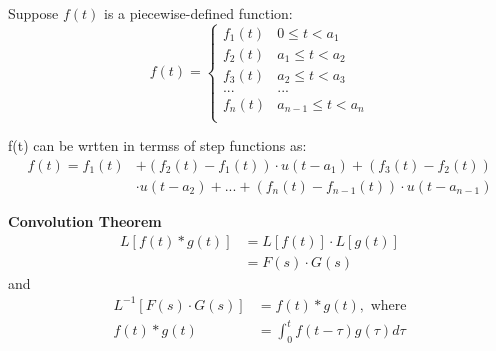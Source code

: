 \documentclass[10pt]{article}
\begin{document}
\begin{multicols}{2}
Suppose \( f(t) \) is a piecewise-defined function:
\[
  f(t) =
  \begin{cases}
    f_1(t) & 0 \leq t < a_1 \\
    f_2(t) & a_1 \leq t < a_2 \\
    f_3(t) & a_2 \leq t < a_3 \\
    ... & ... \\
    f_n(t) & a_{n-1} \leq t < a_n \\
  \end{cases}
\]

f(t) can be wrtten in termss of step functions as:
\begin{align*}
f(t) = f_1(t) &+ (f_2(t) - f_1(t)) \cdot u(t - a_1) + (f_3(t) - f_2(t)) \\
    & \cdot u(t - a_2) + ... + (f_n(t) - f_{n-1}(t)) \cdot u(t - a_{n-1})
\end{align*}

\textbf{Convolution Theorem}
\begin{align}
  L[f(t) * g(t)] &= L[f(t)] \cdot L[g(t)] \\
  &= F(s) \cdot G(s)
\end{align}
and
\begin{align}
  L^{-1}[F(s) \cdot G(s)] &= f(t) * g(t), \text{ where} \\
  f(t)*g(t) &= \int_{0}^{t} f(t - \tau)g(\tau) d\tau
\end{align}

\end{multicols}
\end{document}
